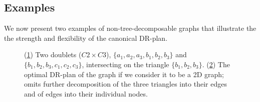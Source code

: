 










\subsection{Examples}

We now present two examples of non-tree-decomposable graphs that illustrate the the strength and flexibility of the canonical DR-plan.

\begin{figure*}\centering
\begin{subfigure}{.3\linewidth}\centering
    
    \caption{}\label{fig:doublets:a}
\end{subfigure}%
\begin{subfigure}{.7\linewidth}\centering
    
    \caption{}\label{fig:doublets:b}
\end{subfigure}

\caption{(\ref{fig:doublets:a}) Two doublets ($C2\times C3$), $\{a_1,a_2,a_3,b_1,b_2,b_3\}$ and $\{b_1,b_2,b_3,c_1,c_2,c_3\}$, intersecting on the triangle $\{b_1,b_2,b_3\}$. (\ref{fig:doublets:b}) The optimal DR-plan of the graph if we consider it to be a 2D graph; omits further decomposition of the three triangles into their edges and of edges into their individual nodes.}
\label{fig:doublets}
\end{figure*}



